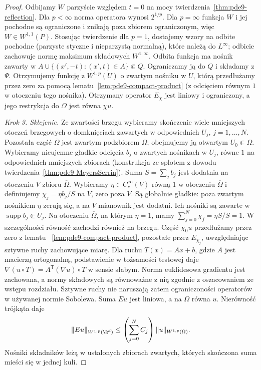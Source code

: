 \begin{proof}
Odbijamy $W$ parzyście względem $t=0$ na mocy
twierdzenia~\ref{thm:pde9-reflection}. Dla $p<\infty$
norma operatora wynosi $2^{1/p}$. Dla $p=\infty$
funkcja $W$ i jej pochodne są ograniczone i znikają
poza zbiorem ograniczonym, więc $W\in W^{1,1}(P)$.
Stosując twierdzenie dla $p=1$, dostajemy wzory
na odbite pochodne (parzyste styczne i nieparzystą
normalną), które należą do $L^\infty$; odbicie
zachowuje normę maksimum składowych $W^{1,\infty}$.
Odbita funkcja ma nośnik zawarty w
$A\cup\{(x',-t):(x',t)\in A\}\Subset Q$.
Ograniczamy ją do $Q$ i składamy z $\Psi$.
Otrzymujemy funkcję z $W^{1,p}(U)$ o zwartym nośniku
w $U$, którą przedłużamy przez zero za pomocą
lematu~\ref{lem:pde9-compact-product} (z odcięciem
równym $1$ w otoczeniu tego nośnika).
Otrzymany operator $E_\chi$ jest liniowy i ograniczony,
a jego restrykcja do $\Omega$ jest równa $\chi u$.

\emph{Krok 3. Sklejenie.}
Ze zwartości brzegu wybieramy skończenie wiele mniejszych
otoczeń brzegowych o domknięciach zawartych w odpowiednich
$U_j$, $j=1,\ldots,N$. Pozostała część $\overline\Omega$
jest zwartym podzbiorem $\Omega$; obejmujemy ją otwartym
$U_0\Subset\Omega$. Wybieramy nieujemne gładkie odcięcia
$b_j$ o zwartych nośnikach w $U_j$, równe $1$ na
odpowiednich mniejszych zbiorach (konstrukcja ze splotem
z dowodu twierdzenia~\ref{thm:pde9-MeyersSerrin}).
Suma $S=\sum_jb_j$ jest dodatnia na otoczeniu $V$
zbioru $\overline\Omega$. Wybieramy $\eta\in C_c^\infty(V)$
równą $1$ w otoczeniu $\overline\Omega$ i definiujemy
$\chi_j=\eta b_j/S$ na $V$, zero poza $V$.
Są globalnie gładkie: poza zwartym nośnikiem $\eta$
zerują się, a na $V$ mianownik jest dodatni.
Ich nośniki są zawarte w $\operatorname{supp}b_j\Subset U_j$.
Na otoczeniu $\overline\Omega$, na którym $\eta=1$,
mamy $\sum_{j=0}^N\chi_j=\eta S/S=1$.
W szczególności równość zachodzi również na brzegu.
Część $\chi_0u$ przedłużamy przez zero z lematu
~\ref{lem:pde9-compact-product}, pozostałe przez $E_{\chi_j}$,
uwzględniając sztywne ruchy zachowujące miarę.
Dla ruchu $T(x)=Ax+b$, gdzie $A$ jest macierzą
ortogonalną, podstawienie w tożsamości testowej
daje $\nabla(u\circ T)=A^{\mathsf T}(\nabla u)\circ T$
w sensie słabym. Norma euklidesowa gradientu jest
zachowana, a normy składowych są równoważne
z nią zgodnie z oszacowaniem ze wstępu rozdziału.
Sztywne ruchy nie naruszają zatem ograniczoności
operatorów w używanej normie Sobolewa.
Suma $Eu$ jest liniowa, a na $\Omega$ równa $u$.
Nierówność trójkąta daje
\[
 \|Eu\|_{W^{1,p}(\R^d)}
 \le\left(\sum_{j=0}^NC_j\right)\|u\|_{W^{1,p}(\Omega)}.
\]
Nośniki składników leżą w ustalonych zbiorach zwartych,
których skończona suma mieści się w jednej kuli.
\end{proof}

